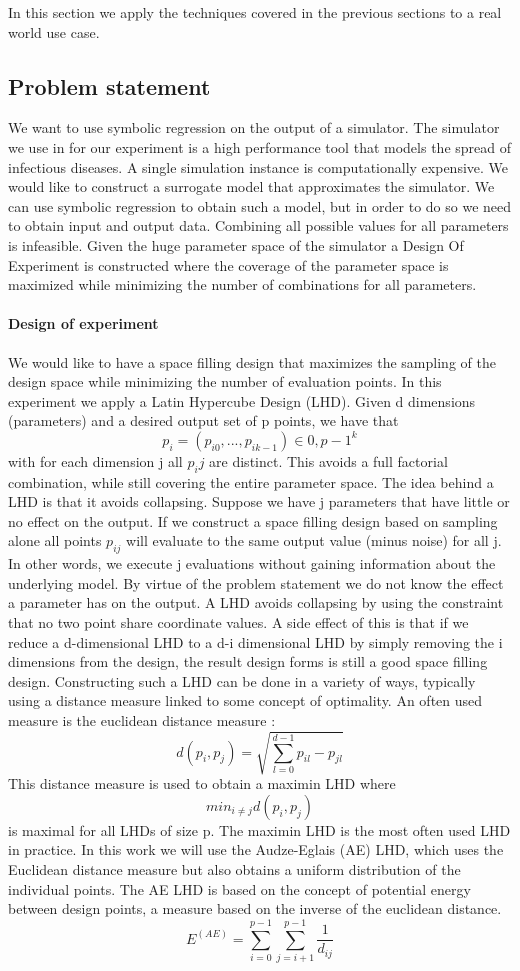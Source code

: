 In this section we apply the techniques covered in the previous sections to a real world use case.
\subsection{Problem statement}
We want to use symbolic regression on the output of a simulator. The simulator we use in for our experiment is a high performance tool \citep{stride} that models the spread of infectious diseases. A single simulation instance is computationally expensive. We would like to construct a surrogate model that approximates the simulator. We can use symbolic regression to obtain such a model, but in order to do so we need to obtain input and output data. Combining all possible values for all parameters is infeasible. 
Given the huge parameter space of the simulator a Design Of Experiment is constructed where the coverage of the parameter space is maximized while minimizing the number of combinations for all parameters. 
\paragraph{Design of experiment}
We would like to have a space filling design that maximizes the sampling of the design space while minimizing the number of evaluation points.
In this experiment we apply a Latin Hypercube Design (LHD). 
Given d dimensions (parameters) and a desired output set of p points, we have that 
\[
p_i = (p_{i0}, ..., p_{i k-1}) \in {0, p -1}^k
\]
with for each dimension j all $p_ij$ are distinct. This avoids a full factorial combination, while still covering the entire parameter space. 
The idea behind a LHD is that it avoids collapsing. Suppose we have j parameters that have little or no effect on the output. If we construct a space filling design based on sampling alone all points $p_{ij}$ will evaluate to the same output value (minus noise) for all j. In other words, we execute j evaluations without gaining information about the underlying model. By virtue of the problem statement we do not know the effect a parameter has on the output. A LHD avoids collapsing by using the constraint that no two point share coordinate values. A side effect of this is that if we reduce a d-dimensional LHD to a d-i dimensional LHD by simply removing the i dimensions from the design, the result design forms is still a good space filling design.
Constructing such a LHD can be done in a variety of ways, typically using a distance measure linked to some concept of optimality. An often used measure is the euclidean distance measure :
\[
d(p_i, p_j) = \sqrt{\sum_{l=0}^{d-1}{p_{il}-p_{jl}}}
\]
This distance measure is used to obtain a maximin LHD where
\[
min_{i \neq j} d(p_i,p_j)
\]
is maximal for all LHDs of size p. The maximin LHD is the most often used LHD in practice. In this work we will use the Audze-Eglais \citep{AudzeEglais, AudzeEglais2, AudzeEglais3} (AE) LHD, which uses the Euclidean distance measure but also obtains a uniform distribution of the individual points. 
The AE LHD is based on the concept of potential energy between design points, a measure based on the inverse of the euclidean distance.
\[
E^(AE) = \sum_{i=0}^{p-1} {\sum_{j=i+1}^{p-1} {\frac{1}{d_{ij}}}}
\]

